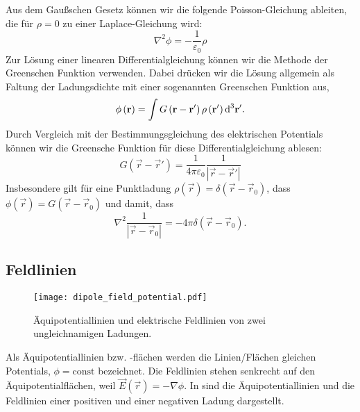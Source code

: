 Aus dem Gaußschen Gesetz können wir die folgende Poisson-Gleichung ableiten, die für $\rho =0$ zu einer Laplace-Gleichung wird:
\begin{equation}
	\label{3.8}
	\boxed{\nabla ^{2}\phi =-\frac{1}{\varepsilon _{0}}\rho }
\end{equation}
Zur Lösung einer linearen Differentialgleichung können wir die Methode der Greenschen Funktion verwenden. Dabei drücken wir die Lösung allgemein als Faltung der Ladungsdichte mit einer sogenannten Greenschen Funktion aus,
\begin{equation}
	\label{3.9}
	\phi \left(\mathbf{r}\right)=\int G\left(\mathbf{r}-\mathbf{r}'\right)\rho \left(\mathbf{r}'\right)\text{d} ^{3}\mathbf{r}'.
\end{equation}
Durch Vergleich mit der Bestimmungsgleichung des elektrischen Potentials können wir die Greensche Funktion für diese Differentialgleichung ablesen:
\begin{equation}
	\label{3.10}
	G\left(\vec {r}-\vec {r}'\right)=\frac{1}{4\pi \varepsilon _{0}}\frac{1}{\left| \vec {r}-\vec {r}'\right| }
\end{equation}
Insbesondere gilt für eine Punktladung $\rho \left(\vec {r}\right)=\delta \left(\vec {r}-\vec {r}_{0}\right)$, dass $\phi \left(\vec {r}\right)=G\left(\vec {r}-\vec {r}_{0}\right)$ und damit, dass
\begin{equation*}
	\nabla ^{2}\frac{1}{\left| \vec {r}-\vec {r}_{0}\right| }=-4\pi \delta \left(\vec {r}-\vec {r}_{0}\right).
\end{equation*}



\subsection{Feldlinien}

\begin{figure}[htb]
	\centering
	\texttt{[image: dipole\_field\_potential.pdf]}
	\caption{Äquipotentiallinien und elektrische Feldlinien von zwei ungleichnamigen Ladungen. }
	\label{fig:dipole_field_potential}
\end{figure}

Als Äquipotentiallinien bzw. -flächen werden die Linien/Flächen gleichen Potentials, $\phi =\text{const}$ bezeichnet. Die Feldlinien stehen senkrecht auf den Äquipotentialflächen, weil $\vec {E}\left(\vec {r}\right)=-\nabla \phi $. In  sind die Äquipotentiallinien und die Feldlinien einer positiven und einer negativen Ladung dargestellt. 

